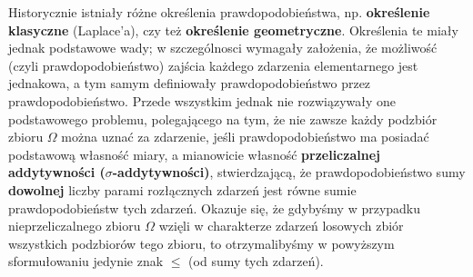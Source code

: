 \documentclass[10pt,a4paper]{article}
\begin{document}
Historycznie istniały różne określenia prawdopodobieństwa, np. \textbf{określenie klasyczne} (Laplace'a), czy też \textbf{określenie geometryczne}.
Określenia te miały jednak podstawowe wady; w szczególnosci wymagały założenia, że możliwość (czyli prawdopodobieństwo) zajścia każdego zdarzenia elementarnego jest
jednakowa, a tym samym definiowały prawdopodobieństwo przez prawdopodobieństwo. Przede wszystkim jednak nie rozwiązywały one podstawowego problemu, polegającego na tym, 
że nie zawsze każdy podzbiór zbioru $\Omega$ można uznać za zdarzenie, jeśli prawdopodobieństwo ma posiadać podstawową własność miary, a mianowicie własność
\textbf{przeliczalnej addytywności ($\sigma$-addytywności)}, stwierdzającą, że prawdopodobieństwo sumy \textbf{dowolnej} liczby parami rozłącznych zdarzeń jest
równe sumie prawdopodobieństw tych zdarzeń. Okazuje się, że gdybyśmy w przypadku nieprzeliczalnego zbioru $\Omega$ wzięli w charakterze zdarzeń losowych zbiór
wszystkich podzbiorów tego zbioru, to otrzymalibyśmy w powyższym sformułowaniu jedynie znak $\leq$ (od sumy tych zdarzeń).
\end{document}
